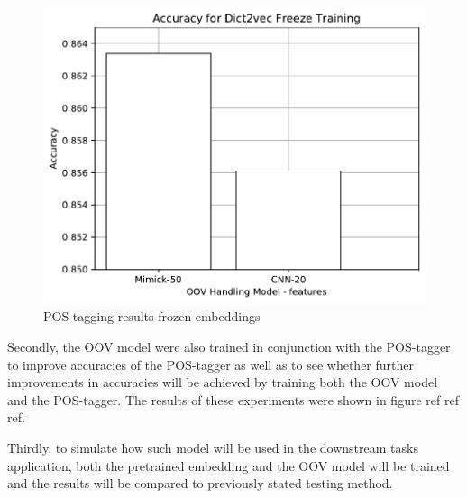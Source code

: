       \begin{figure}[H]
        \centering
        \includegraphics[width=0.8\linewidth]{images/freeze_dict2vec.pdf}
        \caption{POS-tagging results frozen embeddings}
        \label{fig:postag_dict2vec_freeze_results}
      \end{figure}
      
      Secondly, the OOV model were also trained in conjunction with
      the POS-tagger to improve accuracies of the POS-tagger as well
      as to see whether further improvements in accuracies will be
      achieved by training both the OOV model and the POS-tagger. The
      results of these experiments were shown in figure ref ref ref.
      
      Thirdly, to simulate how such model will be used in the
      downstream tasks application, both the pretrained embedding and
      the OOV model will be trained and the results will be compared
      to previously stated testing method.

